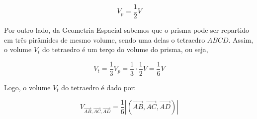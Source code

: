 \[
  V_p = \frac{1}{2} V
\]

Por outro lado, da Geometria Espacial sabemos que o prisma pode ser repartido em
três pirâmides de mesmo volume, sendo uma delas o tetraedro $ABCD$. Assim, o
volume $V_t$ do tetraedro é um terço do volume do prisma, ou seja,

\[
  V_t = \frac{1}{3} V_p = \frac{1}{3} \cdot \frac{1}{2} V = \frac{1}{6} V
\]

Logo, o volume $V_t$ do tetraedro é dado por:

\[
  V_{\overrightarrow{AB}, \overrightarrow{AC}, \overrightarrow{AD}} = \frac{1}{6} |(\overrightarrow{AB}, \overrightarrow{AC}, \overrightarrow{AD})|
\]
